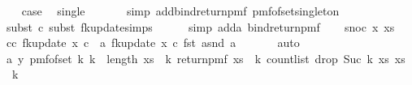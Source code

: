 \begin{isabellebody}
\ \ \isamarkupfalse%
\ {\isacharquery}{\kern0pt}case\ \isamarkupfalse%
\ single\ \isanewline
\ \ \ \ \isamarkupfalse%
\ {\isacharparenleft}{\kern0pt}simp\ add{\isacharcolon}{\kern0pt}bind{\isacharunderscore}{\kern0pt}return{\isacharunderscore}{\kern0pt}pmf\ pmf{\isacharunderscore}{\kern0pt}of{\isacharunderscore}{\kern0pt}set{\isacharunderscore}{\kern0pt}singleton{\isacharparenright}{\kern0pt}\ \isanewline
\ \ \ \ \isamarkupfalse%
\ {\isacharparenleft}{\kern0pt}subst\ c{\isacharcomma}{\kern0pt}\ subst\ fk{\isacharunderscore}{\kern0pt}update{\isacharprime}{\kern0pt}{\isacharprime}{\kern0pt}{\isachardot}{\kern0pt}simps{\isacharparenright}{\kern0pt}\isanewline
\ \ \ \ \isamarkupfalse%
\ {\isacharparenleft}{\kern0pt}simp\ add{\isacharcolon}{\kern0pt}a\ bind{\isacharunderscore}{\kern0pt}return{\isacharunderscore}{\kern0pt}pmf{\isacharparenright}{\kern0pt}\isanewline
{}\isamarkupfalse%
\isanewline
\ \ \isamarkupfalse%
\ {\isacharparenleft}{\kern0pt}snoc\ x\ xs{\isacharparenright}{\kern0pt}\isanewline
\ \ \isamarkupfalse%
\ c{\isacharcolon}{\kern0pt}{\isachardoublequoteopen}{\isasymAnd}c{\isachardot}{\kern0pt}\ fk{\isacharunderscore}{\kern0pt}update{\isacharprime}{\kern0pt}{\isacharprime}{\kern0pt}\ x\ c\ {\isacharequal}{\kern0pt}\ {\isacharparenleft}{\kern0pt}{\isasymlambda}a{\isachardot}{\kern0pt}\ fk{\isacharunderscore}{\kern0pt}update{\isacharprime}{\kern0pt}{\isacharprime}{\kern0pt}\ x\ c\ {\isacharparenleft}{\kern0pt}fst\ a{\isacharcomma}{\kern0pt}snd\ a{\isacharparenright}{\kern0pt}{\isacharparenright}{\kern0pt}{\isachardoublequoteclose}\ \isanewline
\ \ \ \ \isamarkupfalse%
\ auto\isanewline
\ \ \isamarkupfalse%
\ a{\isacharcolon}{\kern0pt}\ {\isachardoublequoteopen}{\isasymAnd}y{\isachardot}{\kern0pt}\ pmf{\isacharunderscore}{\kern0pt}of{\isacharunderscore}{\kern0pt}set\ {\isacharbraceleft}{\kern0pt}k{\isachardot}{\kern0pt}\ k\ {\isacharless}{\kern0pt}\ length\ xs{\isacharbraceright}{\kern0pt}\ {\isasymbind}\ {\isacharparenleft}{\kern0pt}{\isasymlambda}k{\isachardot}{\kern0pt}\ return{\isacharunderscore}{\kern0pt}pmf\ {\isacharparenleft}{\kern0pt}xs\ {\isacharbang}{\kern0pt}\ k{\isacharcomma}{\kern0pt}\ count{\isacharunderscore}{\kern0pt}list\ {\isacharparenleft}{\kern0pt}drop\ {\isacharparenleft}{\kern0pt}Suc\ k{\isacharparenright}{\kern0pt}\ xs{\isacharparenright}{\kern0pt}\ {\isacharparenleft}{\kern0pt}xs\ {\isacharbang}{\kern0pt}\ k{\isacharparenright}{\kern0pt}{\isacharparenright}{\kern0pt}\ {\isasymbind}\isanewline

\end{isabellebody}
